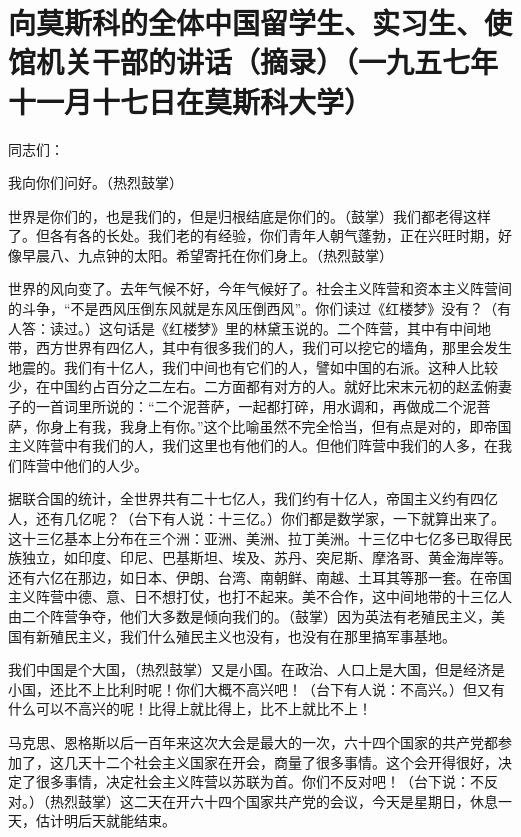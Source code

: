 \section[向莫斯科的全体中国留学生、实习生、使馆机关干部的讲话（摘录）（一九五七年十一月十七日在莫斯科大学）]{向莫斯科的全体中国留学生、实习生、使馆机关干部的讲话（摘录）（一九五七年十一月十七日在莫斯科大学）}


同志们：

我向你们问好。（热烈鼓掌）

世界是你们的，也是我们的，但是归根结底是你们的。（鼓掌）我们都老得这样了。但各有各的长处。我们老的有经验，你们青年人朝气蓬勃，正在兴旺时期，好像早晨八、九点钟的太阳。希望寄托在你们身上。（热烈鼓掌）

世界的风向变了。去年气候不好，今年气候好了。社会主义阵营和资本主义阵营间的斗争，“不是西风压倒东风就是东风压倒西风”。你们读过《红楼梦》没有？（有人答：读过。）这句话是《红楼梦》里的林黛玉说的。二个阵营，其中有中间地带，西方世界有四亿人，其中有很多我们的人，我们可以挖它的墙角，那里会发生地震的。我们有十亿人，我们中间也有它们的人，譬如中国的右派。这种人比较少，在中国约占百分之二左右。二方面都有对方的人。就好比宋末元初的赵孟俯妻子的一首词里所说的：“二个泥菩萨，一起都打碎，用水调和，再做成二个泥菩萨，你身上有我，我身上有你。”这个比喻虽然不完全恰当，但有点是对的，即帝国主义阵营中有我们的人，我们这里也有他们的人。但他们阵营中我们的人多，在我们阵营中他们的人少。

据联合国的统计，全世界共有二十七亿人，我们约有十亿人，帝国主义约有四亿人，还有几亿呢？（台下有人说：十三亿。）你们都是数学家，一下就算出来了。这十三亿基本上分布在三个洲：亚洲、美洲、拉丁美洲。十三亿中七亿多已取得民族独立，如印度、印尼、巴基斯坦、埃及、苏丹、突尼斯、摩洛哥、黄金海岸等。还有六亿在那边，如日本、伊朗、台湾、南朝鲜、南越、土耳其等那一套。在帝国主义阵营中德、意、日不想打仗，也打不起来。美不合作，这中间地带的十三亿人由二个阵营争夺，他们大多数是倾向我们的。（鼓掌）因为英法有老殖民主义，美国有新殖民主义，我们什么殖民主义也没有，也没有在那里搞军事基地。

我们中国是个大国，（热烈鼓掌）又是小国。在政治、人口上是大国，但是经济是小国，还比不上比利时呢！你们大概不高兴吧！（台下有人说：不高兴。）但又有什么可以不高兴的呢！比得上就比得上，比不上就比不上！

马克思、恩格斯以后一百年来这次大会是最大的一次，六十四个国家的共产党都参加了，这几天十二个社会主义国家在开会，商量了很多事情。这个会开得很好，决定了很多事情，决定社会主义阵营以苏联为首。你们不反对吧！（台下说：不反对。）（热烈鼓掌）这二天在开六十四个国家共产党的会议，今天是星期日，休息一天，估计明后天就能结束。

